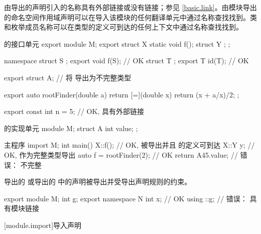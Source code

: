 \pnum
\begin{note}
由导出的声明引入的名称具有外部链接或没有链接；参见 \ref{basic.link}。由模块导出的命名空间作用域声明可以在导入该模块的任何翻译单元中通过名称查找找到。类和枚举成员名称可以在类型的定义可到达的任何上下文中通过名称查找找到。
\end{note}
\begin{example}
\begin{codeblocktu}{ 的接口单元}
export module M;
export struct X {
  static void f();
  struct Y { };
};

namespace {
  struct S { };
}
export void f(S);               // OK
struct T { };
export T id(T);                 // OK

export struct A;                // 将  导出为不完整类型

export auto rootFinder(double a) {
  return [=](double x) { return (x + a/x)/2; };
}

export const int n = 5;         // OK,  具有外部链接
\end{codeblocktu}

\begin{codeblocktu}{ 的实现单元}
module M;
struct A {
  int value;
};
\end{codeblocktu}

\begin{codeblocktu}{主程序}
import M;
int main() {
  X::f();                       // OK,  被导出并且  的定义可到达
  X::Y y;                       // OK,  作为完整类型导出
  auto f = rootFinder(2);       // OK
  return A{45}.value;           // 错误： 不完整
}
\end{codeblocktu}
\end{example}

\pnum
\begin{note}
导出的  或导出的  中的声明被导出并受导出声明规则的约束。
\begin{example}
\begin{codeblock}
export module M;
int g;
export namespace N {
  int x;                        // OK
  using ::g;                    // 错误： 具有模块链接
}
\end{codeblock}
\end{example}
\end{note}

[module.import]{导入声明}%

